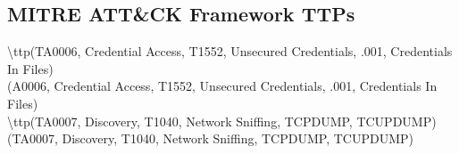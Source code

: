 \documentclass[notitlepage]{article}
\begin{document}
	
	\subsection{MITRE ATT{\&}CK Framework TTPs}
	
	\indent\textbackslash ttp(TA0006, Credential Access, T1552, Unsecured Credentials, .001, Credentials In Files) \\
	\ttp(A0006, Credential Access, T1552, Unsecured Credentials, .001, Credentials In Files) \\
	
	\indent\textbackslash ttp(TA0007, Discovery, T1040, Network Sniffing, TCPDUMP, TCUPDUMP) \\
	\ttp(TA0007, Discovery, T1040, Network Sniffing, TCPDUMP, TCUPDUMP) \\
\end{document}

